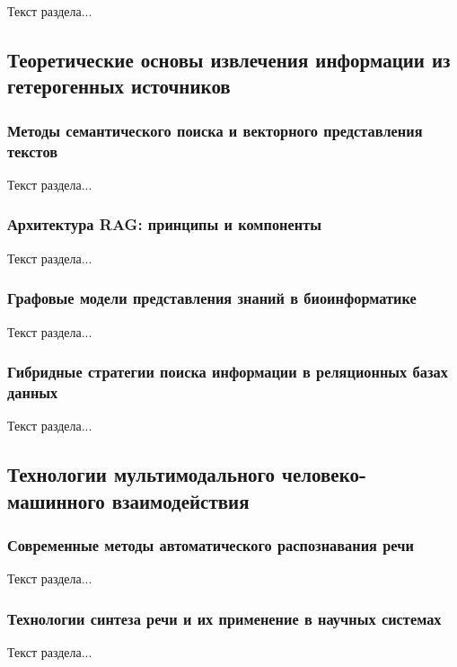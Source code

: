 Текст раздела...

\subsection{Теоретические основы извлечения информации из гетерогенных источников}

\subsubsection{Методы семантического поиска и векторного представления текстов}

Текст раздела...

\subsubsection{Архитектура RAG: принципы и компоненты}

Текст раздела...

\subsubsection{Графовые модели представления знаний в биоинформатике}

Текст раздела...

\subsubsection{Гибридные стратегии поиска информации в реляционных базах данных}

Текст раздела...

\subsection{Технологии мультимодального человеко-машинного взаимодействия}

\subsubsection{Современные методы автоматического распознавания речи}

Текст раздела...

\subsubsection{Технологии синтеза речи и их применение в научных системах}

Текст раздела...

